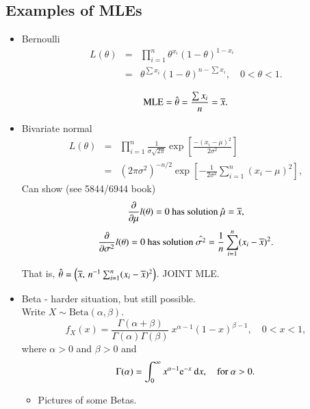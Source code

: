 \documentclass[captions=tableheading]{scrbook}
\begin{document}
\subsection{Examples of MLEs}
\label{sec-1_1_3}
\begin{itemize}

\item Bernoulli
\label{sec-1_1_3_1}%
\begin{eqnarray*}
L(\theta) & = & \prod_{i=1}^{n}\theta^{x_{i}}(1-\theta)^{1-x_{i}}\\
 & = & \theta^{\sum x_{i}}(1-\theta)^{n-\sum x_{i}},\quad0<\theta<1.
\end{eqnarray*}

\[
\mathrm{MLE} = \hat{\theta} = \frac{\sum x_{i}}{n} = \overline{x}. 
\]


\item Bivariate normal
\label{sec-1_1_3_2}%
\begin{eqnarray*}
L(\theta) & = & \prod_{i=1}^{n}\frac{1}{\sigma\sqrt{2\pi}}\exp\left[\frac{-(x_{i}-\mu)^{2}}{2\sigma^{2}}\right]\\
 & = & (2\pi\sigma^{2})^{-n/2}\exp\left[-\frac{1}{2\sigma^{2}}\sum_{i=1}^{n}(x_{i}-\mu)^{2}\right],
\end{eqnarray*}
Can show (see 5844/6944 book)
\[
\frac{\partial}{\partial\mu}l(\theta) = 0 \mbox{ has solution } \hat{\mu}=\overline{x},
\]
\[
\frac{\partial}{\partial\sigma^{2}}l(\theta) = 0 \mbox{ has solution } \hat{\sigma^{2}}=\frac{1}{n}\sum_{i=1}^{n}(x_{i} - \overline{x})^{2}.
\]

That is, $\hat{\theta} = \left(\overline{x},\,n^{-1}\sum_{i=1}^{n}(x_{i} - \overline{x})^{2}\right)$.  JOINT MLE.


\item Beta - harder situation, but still possible.\\
\label{sec-1_1_3_3}%
Write $X \sim \mathrm{Beta}(\alpha,\beta)$.
\begin{equation}
f_{X}(x)=\frac{\Gamma(\alpha+\beta)}{\Gamma(\alpha)\Gamma(\beta)}\: x^{\alpha-1}(1-x)^{\beta-1},\quad0 < x <1,
\end{equation}
where $\alpha > 0$ and $\beta > 0$ and
\begin{equation}
\Gamma(\alpha)=\int_{0}^{\infty}x^{\alpha-1}\mathrm{e}^{-x}\:\mathrm{d} x,\quad\mbox{for }\alpha>0.
\end{equation}



\begin{itemize}
\item Pictures of some Betas.
\end{itemize}


\end{itemize}
\end{document}
